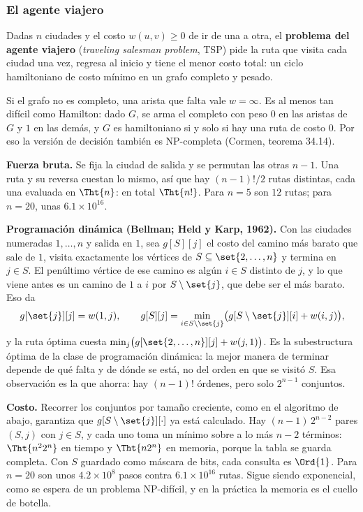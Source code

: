 \documentclass[11pt,letterpaper]{article}
\begin{document}

\subsubsection*{El agente viajero}

\begin{definicion}
  Dadas $n$ ciudades y el costo $w(u, v) \ge 0$ de ir de una a otra,
  el \textbf{problema del agente viajero} (\textit{traveling salesman
  problem}, TSP) pide la ruta que visita cada ciudad una vez, regresa
  al inicio y tiene el menor costo total: un ciclo hamiltoniano de
  costo mínimo en un grafo completo y pesado.
\end{definicion}

Si el grafo no es completo, una arista que falta vale $w = \infty$.
Es al menos tan difícil como Hamilton: dado $G$, se arma el completo
con peso $0$ en las aristas de $G$ y $1$ en las demás, y $G$ es
hamiltoniano si y solo si hay una ruta de costo $0$. Por eso la
versión de decisión también es NP-completa (Cormen, teorema 34.14).

\textbf{Fuerza bruta.} Se fija la ciudad de salida y se permutan las
otras $n - 1$. Una ruta y su reversa cuestan lo mismo, así que hay
$(n-1)!/2$ rutas distintas, cada una evaluada en $\Tht{n}$: en total
$\Tht{n!}$. Para $n = 5$ son $12$ rutas; para $n = 20$, unas
$6.1 \times 10^{16}$.

\textbf{Programación dinámica (Bellman; Held y Karp, 1962).} Con las
ciudades numeradas $1, \dots, n$ y salida en $1$, sea $g[S][j]$ el
costo del camino más barato que sale de $1$, visita exactamente los
vértices de $S \subseteq \set{2, \dots, n}$ y termina en $j \in S$.
El penúltimo vértice de ese camino es algún $i \in S$ distinto de
$j$, y lo que viene antes es un camino de $1$ a $i$ por
$S \setminus \set{j}$, que debe ser el más barato. Eso da
\[
  g[\set{j}][j] = w(1, j) , \qquad
  g[S][j] = \min_{i \in S \setminus \set{j}}
            \bigl( g[S \setminus \set{j}][i] + w(i, j) \bigr) ,
\]
y la ruta óptima cuesta
$\min_{j} \bigl( g[\set{2, \dots, n}][j] + w(j, 1) \bigr)$. Es la
subestructura óptima de la clase de programación dinámica: la mejor
manera de terminar depende de qué falta y de dónde se está, no del
orden en que se visitó $S$. Esa observación es la que ahorra: hay
$(n-1)!$ órdenes, pero solo $2^{n-1}$ conjuntos.

\textbf{Costo.} Recorrer los conjuntos por tamaño creciente, como en
el algoritmo de abajo, garantiza que $g[S \setminus \set{j}][\cdot]$
ya está calculado. Hay $(n-1)\, 2^{n-2}$ pares $(S, j)$ con
$j \in S$, y cada uno toma un mínimo sobre a lo más $n - 2$
términos: $\Tht{n^2 2^n}$ en tiempo y $\Tht{n 2^n}$ en memoria,
porque la tabla se guarda completa. Con $S$ guardado como máscara de
bits, cada consulta es $\Ord{1}$. Para
$n = 20$ son unos $4.2 \times 10^8$ pasos contra $6.1 \times 10^{16}$
rutas. Sigue siendo exponencial, como se espera de un problema
NP-difícil, y en la práctica la memoria es el cuello de botella.
\end{document}
